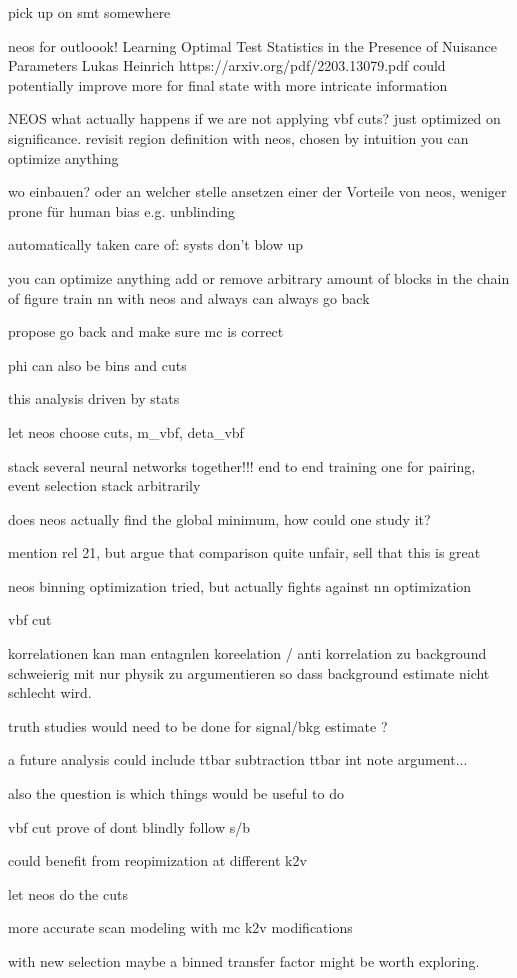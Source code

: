 
pick up on smt somewhere


neos
for outloook!
Learning Optimal Test Statistics in the Presence of
Nuisance Parameters
Lukas Heinrich
https://arxiv.org/pdf/2203.13079.pdf 
could potentially improve more for final state with more intricate information

NEOS
what actually happens if we are not applying vbf cuts? just optimized on significance.
revisit region definition with neos, chosen by intuition 
you can optimize anything 

wo einbauen? oder an welcher stelle ansetzen
einer der Vorteile von neos, weniger prone für human bias e.g. unblinding

automatically taken care of: systs don't blow up

you can optimize anything
add or remove arbitrary amount of blocks in the chain of figure 
train nn with neos and always can always go back

propose go back and make sure mc is correct

phi can also be bins and cuts

this analysis driven by stats

let neos choose cuts,
m_vbf, deta_vbf


stack several neural networks together!!! end to end training 
one for pairing, event selection 
stack arbitrarily 

does neos actually find the global minimum, how could one study it?


mention rel 21, but argue that comparison quite unfair, sell that this is great


neos
binning optimization tried, but actually fights against nn optimization


vbf cut

korrelationen kan man entagnlen
koreelation / anti korrelation zu background schweierig mit nur physik zu argumentieren 
so dass background estimate nicht schlecht wird.

truth studies would need to be done for signal/bkg estimate ? 

a future analysis could include ttbar subtraction
ttbar int note argument...


also the question is which things would be useful to do 


vbf cut prove of dont blindly follow s/b

could benefit from reopimization at different k2v

let neos do the cuts 

more accurate scan modeling with mc k2v modifications 

with new selection maybe a binned transfer factor might be worth exploring.